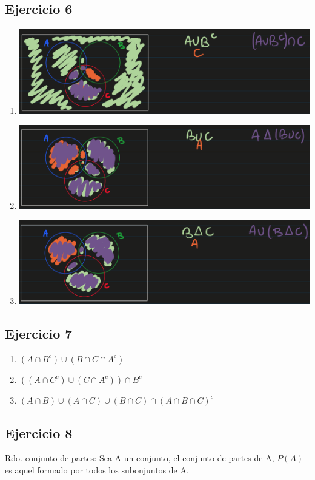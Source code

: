 \subsection{Ejercicio 6}
\begin{enumerate}[label=(\alph*)]
    \item \includegraphics[width=500px]{1.6.1}
    \item \includegraphics[width=500px]{1.6.2}
    \item \includegraphics[width=500px]{1.6.3}
\end{enumerate}

\subsection{Ejercicio 7}
\begin{enumerate}[label=(\alph*)]
    \item $(A \cap B^c) \cup (B \cap C \cap A^c)$
    \item $((A \cap C^c) \cup (C \cap A^c)) \cap B^c$
    \item $(A \cap B) \cup (A \cap C) \cup (B \cap C) \cap (A \cap B \cap C)^c$
\end{enumerate}

\subsection{Ejercicio 8}
Rdo. conjunto de partes: Sea A un conjunto, el conjunto de partes de A, $P(A)$ es aquel formado por todos los subonjuntos de A.

